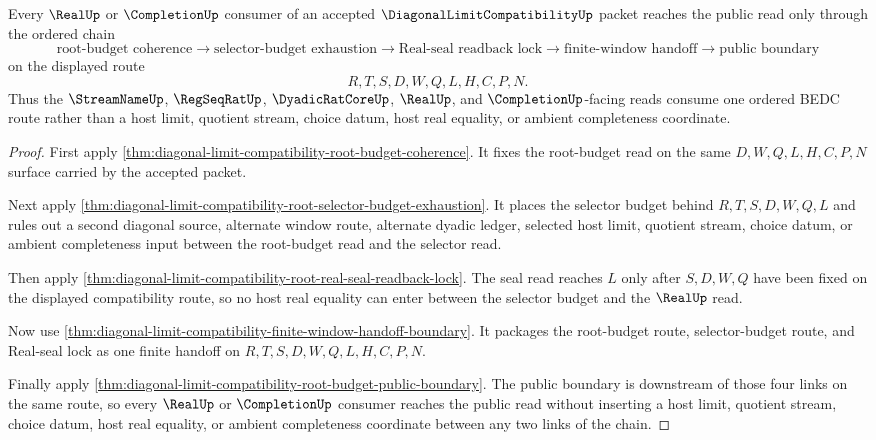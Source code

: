 \begin{theorem}
\label{thm:diagonal-limit-compatibility-root-budget-consumer-chain}
Every $\RealUp$ or $\CompletionUp$ consumer of an accepted
$\DiagonalLimitCompatibilityUp$ packet reaches the public read only through
the ordered chain
$$
\text{root-budget coherence}
\to
\text{selector-budget exhaustion}
\to
\text{Real-seal readback lock}
\to
\text{finite-window handoff}
\to
\text{public boundary}
$$
on the displayed route
$$
R,T,S,D,W,Q,L,H,C,P,N.
$$
Thus the $\StreamNameUp$, $\RegSeqRatUp$, $\DyadicRatCoreUp$, $\RealUp$, and
$\CompletionUp$-facing reads consume one ordered BEDC route rather than a
host limit, quotient stream, choice datum, host real equality, or ambient
completeness coordinate.
\end{theorem}
\begin{proof}
First apply
\autoref{thm:diagonal-limit-compatibility-root-budget-coherence}. It fixes the
root-budget read on the same $D,W,Q,L,H,C,P,N$ surface carried by the accepted
packet.

Next apply
\autoref{thm:diagonal-limit-compatibility-root-selector-budget-exhaustion}. It
places the selector budget behind $R,T,S,D,W,Q,L$ and rules out a second
diagonal source, alternate window route, alternate dyadic ledger, selected
host limit, quotient stream, choice datum, or ambient completeness input
between the root-budget read and the selector read.

Then apply
\autoref{thm:diagonal-limit-compatibility-root-real-seal-readback-lock}. The
seal read reaches $L$ only after $S,D,W,Q$ have been fixed on the displayed
compatibility route, so no host real equality can enter between the selector
budget and the $\RealUp$ read.

Now use
\autoref{thm:diagonal-limit-compatibility-finite-window-handoff-boundary}. It
packages the root-budget route, selector-budget route, and Real-seal lock as
one finite handoff on $R,T,S,D,W,Q,L,H,C,P,N$.

Finally apply
\autoref{thm:diagonal-limit-compatibility-root-budget-public-boundary}. The
public boundary is downstream of those four links on the same route, so every
$\RealUp$ or $\CompletionUp$ consumer reaches the public read without inserting
a host limit, quotient stream, choice datum, host real equality, or ambient
completeness coordinate between any two links of the chain.
\end{proof}

